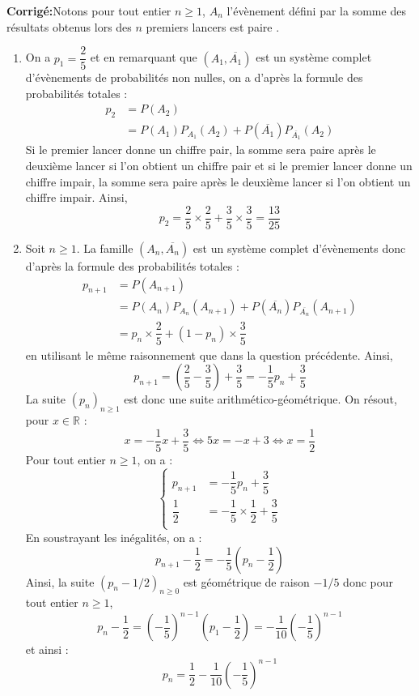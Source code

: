 \documentclass[a4paper,twoside,french,10pt]{VcCours}
\newcommand{\corr}{\textbf{Corrigé:}}
\begin{document}
\corr Notons pour tout entier $n \geq 1$, $A_n$ l'évènement défini par \og la somme des résultats obtenus lors des $n$ premiers lancers est paire \fg .

\begin{enumerate}
\item On a $p_1= \dfrac{2}{5}$ et en remarquant que $(A_1, \overline{A_1})$ est un système complet d'évènements de probabilités non nulles, on a d'après la formule des probabilités totales :
\begin{align*}
p_2  & = P(A_2) \\
& = P(A_1)P_{A_1}(A_2) + P(\overline{A_1})P_{\overline{A_1}}(A_2) 
\end{align*}
Si le premier lancer donne un chiffre pair, la somme sera paire après le deuxième lancer si l'on obtient un chiffre pair et si le premier  lancer donne un chiffre impair, la somme sera paire après le deuxième lancer si l'on obtient un chiffre impair. Ainsi,
$$ p_2 = \dfrac{2}{5} \times \dfrac{2}{5} + \dfrac{3}{5} \times \dfrac{3}{5}  = \dfrac{13}{25}$$
\item Soit $n \geq 1$. La famille $(A_n, \overline{A_n})$ est un système complet d'évènements  donc d'après la formule des probabilités totales :
\begin{align*}
p_{n+1}  & = P(A_{n+1}) \\
& = P(A_n)P_{A_n}(A_{n+1}) + P(\overline{A_n})P_{\overline{A_n}}(A_{n+1}) \\
& = p_n \times \dfrac{2}{5} + (1-p_n) \times \dfrac{3}{5}
\end{align*}
en utilisant le même raisonnement que dans la question précédente. Ainsi,
$$ p_{n+1} = \left( \dfrac{2}{5} - \dfrac{3}{5} \right) + \dfrac{3}{5} = - \dfrac{1}{5} p_n + \dfrac{3}{5}$$
La suite $(p_n)_{n \geq 1}$ est donc une suite arithmético-géométrique. On résout, pour $x \in \mathbb{R}$ :
$$ x = - \dfrac{1}{5} x + \dfrac{3}{5} \Longleftrightarrow 5x=-x+3 \Longleftrightarrow x= \dfrac{1}{2}$$
Pour tout entier $n \geq 1$, on a :
$$ \left\lbrace \begin{array}{cl}
p_{n+1} & =  - \dfrac{1}{5} p_n + \dfrac{3}{5} \\[0.3cm]
\dfrac{1}{2} & =  - \dfrac{1}{5} \times \dfrac{1}{2}+ \dfrac{3}{5} \\
\end{array}\right.$$
En soustrayant les inégalités, on a :
$$ p_{n+1} - \dfrac{1}{2} = - \dfrac{1}{5} \left( p_n - \dfrac{1}{2} \right) $$
Ainsi, la suite $(p_n-1/2)_{n \geq 0}$ est géométrique de raison $-1/5$ donc pour tout entier $n \geq 1$,
$$ p_n - \dfrac{1}{2} = \left( - \dfrac{1}{5} \right)^{n-1} \left(p_1 - \dfrac{1}{2} \right) = - \dfrac{1}{10}  \left( - \dfrac{1}{5} \right)^{n-1}$$
et ainsi :
$$ p_n = \dfrac{1}{2} - \dfrac{1}{10}  \left( - \dfrac{1}{5} \right)^{n-1}$$
\end{enumerate}
\end{document}
